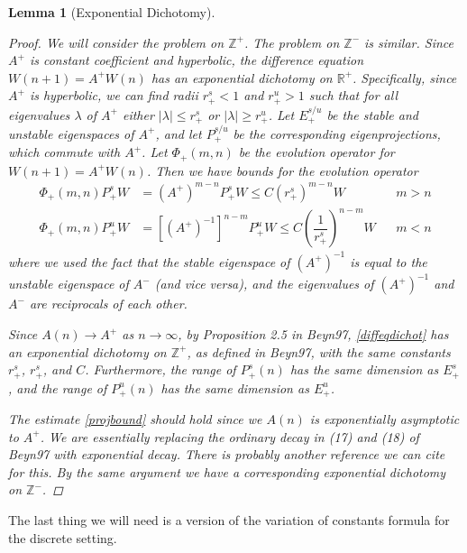 \documentclass[12pt]{article}
\def\R{{\mathbb R}}
\def\Z{{\mathbb Z}}
\newtheorem{lemma}{Lemma}
\begin{document}
\begin{lemma}[Exponential Dichotomy]
\begin{proof}
We will consider the problem on $\Z^+$. The problem on $\Z^-$ is similar. Since $A^+$ is constant coefficient and hyperbolic, the difference equation $W(n+1) = A^+ W(n)$ has an exponential dichotomy on $\R^+$. Specifically, since $A^+$ is hyperbolic, we can find radii $r_+^s < 1$ and $r_+^u > 1$ such that for all eigenvalues $\lambda$ of $A^+$ either $|\lambda| \leq r_+^s$ or $|\lambda| \geq r_+^u$. Let $E_+^{s/u}$ be the stable and unstable eigenspaces of $A^+$, and let $P_+^{s/u}$ be the corresponding eigenprojections, which commute with $A^+$. Let $\Phi_+(m, n)$ be the evolution operator for $W(n+1) = A^+ W(n)$. Then we have bounds for the evolution operator
\begin{align*}
\Phi_+(m, n) P_+^s W &= (A^+)^{m-n} P_+^s W \leq C (r_+^s)^{m-n} W  && m > n \\
\Phi_+(m, n) P_+^u W &= [(A^+)^{-1}]^{n-m} P_+^u W \leq C \left( \dfrac{1}{r_+^s} \right)^{n-m} W && m < n
\end{align*}
where we used the fact that the stable eigenspace of $(A^+)^{-1}$ is equal to the unstable eigenspace of $A^-$ (and vice versa), and the eigenvalues of $(A^+)^{-1}$ and $A^-$ are reciprocals of each other.

Since $A(n) \rightarrow A^+$ as $n \rightarrow \infty$, by Proposition 2.5 in Beyn97, \eqref{diffeqdichot} has an exponential dichotomy on $\Z^+$, as defined in Beyn97, with the same constants $r_+^s$, $r_+^s$, and $C$. Furthermore, the range of $P_+^s(n)$ has the same dimension as $E_+^s$, and the range of $P_+^u(n)$ has the same dimension as $E_+^u$.

The estimate \eqref{projbound} should hold since we $A(n)$ is exponentially asymptotic to $A^+$. We are essentially replacing the ordinary decay in (17) and (18) of Beyn97 with exponential decay. There is probably another reference we can cite for this. By the same argument we have a corresponding exponential dichotomy on $\Z^-$.
\end{proof}
\end{lemma}

The last thing we will need is a version of the variation of constants formula for the discrete setting.
\end{document}
